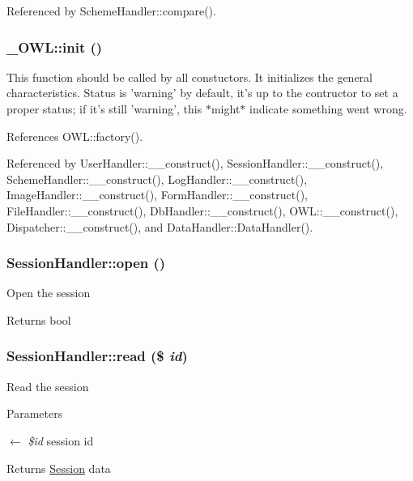 Referenced by SchemeHandler::compare().

\subsubsection[{init}]{\setlength{\rightskip}{0pt plus 5cm}\_\-OWL::init ()}\label{class__OWL_ae0ef3ded56e8a6b34b6461e5a721cd3e}
This function should be called by all constuctors. It initializes the general characteristics. Status is 'warning' by default, it's up to the contructor to set a proper status; if it's still 'warning', this $\ast$might$\ast$ indicate something went wrong. 

References OWL::factory().



Referenced by UserHandler::\_\-\_\-construct(), SessionHandler::\_\-\_\-construct(), SchemeHandler::\_\-\_\-construct(), LogHandler::\_\-\_\-construct(), ImageHandler::\_\-\_\-construct(), FormHandler::\_\-\_\-construct(), FileHandler::\_\-\_\-construct(), DbHandler::\_\-\_\-construct(), OWL::\_\-\_\-construct(), Dispatcher::\_\-\_\-construct(), and DataHandler::DataHandler().

\subsubsection[{open}]{\setlength{\rightskip}{0pt plus 5cm}SessionHandler::open ()}\label{classSessionHandler_a50aa0b123f53d99de350a0eb02b4bfa5}
Open the session

\begin{DoxyReturn}{Returns}
bool 
\end{DoxyReturn}
\subsubsection[{read}]{\setlength{\rightskip}{0pt plus 5cm}SessionHandler::read (\$ {\em id})}\label{classSessionHandler_a58cc3e5bf5b14e7bfbc73162de1f5d2b}
Read the session


\begin{DoxyParams}{Parameters}
\item[\mbox{$\leftarrow$} {\em \$id}]session id \end{DoxyParams}
\begin{DoxyReturn}{Returns}
\hyperlink{classSession}{Session} data 
\end{DoxyReturn}


